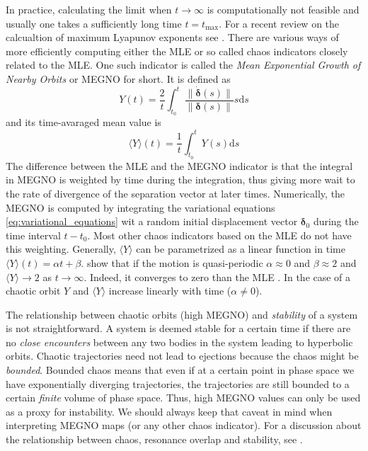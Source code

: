 \documentclass[ twoside,openright,titlepage,numbers=noenddot,headinclude,%
                footinclude=true,cleardoublepage=empty,abstractoff, %
                BCOR=5mm,paper=a4,fontsize=11pt,%
                american,%
                ]{scrreprt}
\begin{document}
In practice, calculating the limit when $t\rightarrow\infty$ is 
computationally not feasible and usually one takes a 
sufficiently long time $t=t_\text{max}$. For a recent review on the calcualtion
of maximum Lyapunov exponents see \cite{skokos}.
There are various ways of more efficiently computing either the MLE or so called
chaos indicators closely related to the MLE. One such indicator is called the 
\emph{Mean Exponential Growth of Nearby Orbits} \citep{refId0,cincotta2003} or MEGNO for short. 
It is defined as
\begin{equation}
    Y(t)= \frac{2}{t} \int^t_{t_0} \frac{\lVert \dot{\boldsymbol{\delta}}(s)\rVert}{\lVert 
    \boldsymbol{\delta}(s)\rVert}s\mathrm{d}s
\end{equation}
and its time-avaraged mean value is 
\begin{equation}
    \langle Y\rangle\left( t\right)= \frac{1}{t} \int^t_{t_0} Y(s)\mathrm{d}s
\end{equation}
The difference between the MLE and the MEGNO indicator is that the integral in MEGNO
is weighted by time during the integration, thus giving more wait to the rate 
of divergence of the separation vector at later times. Numerically, the MEGNO
is computed by integrating the variational equations \cref{eq:variational_equations}
wit a random initial displacement vector $\boldsymbol{\delta}_0$
during the time interval $t-t_0$. Most other chaos indicators based on the
MLE do not have this weighting. 
Generally, $\langle Y\rangle$ can be parametrized as a linear function in time
$\langle Y\rangle (t)=\alpha t+\beta$. \cite{cincotta2003} show that if the 
motion is quasi-periodic $\alpha\approx 0$ and $\beta\approx 2$ and 
$\langle Y\rangle \rightarrow 2$ as $t\rightarrow \infty$. Indeed, it
converges to zero than the MLE \citep{cincotta2003}. In the case of a chaotic
orbit $Y$ and $\langle Y\rangle$ increase linearly with time ($\alpha\neq 0$).

The relationship between chaotic orbits (high MEGNO) and \emph{stability} of
a system is not straightforward. A system is deemed stable for a certain time 
if there are no \emph{close encounters}  between any two bodies in the system 
leading to hyperbolic orbits. Chaotic trajectories need not lead to ejections
because the chaos might be \emph{bounded}. Bounded chaos means that even
if at a certain point in phase space we have exponentially diverging 
trajectories, the trajectories are still bounded to a certain \emph{finite} 
volume of phase space. Thus, high MEGNO values can only be used as a proxy
for instability. We should always keep that caveat in mind when 
interpreting MEGNO maps (or any other chaos indicator). For a discussion about 
the relationship between chaos,
 resonance overlap and  stability, see \cite{Deck2013}.
\end{document}

